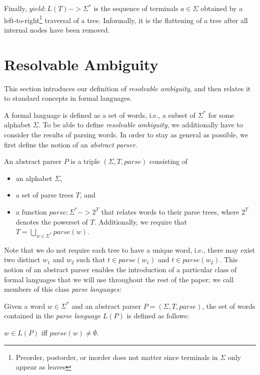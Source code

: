 \documentclass[acmsmall,review,anonymous]{acmart}\settopmatter{printfolios=true,printccs=false,printacmref=false}
\newcommand{\T}{\Sigma} %
\newcommand{\parse}{\mathit{parse}} %
\begin{document}
Finally, $yield : L(T) -> \T^{*}$ is the sequence of terminals $a \in \T$ obtained by a left-to-right\footnote{Preorder, postorder, or inorder does not matter since terminals in $\T$ only appear as leaves} traversal of a tree. Informally, it is the flattening of a tree after all internal nodes have been removed.

\section{Resolvable Ambiguity} \label{sec:resolvable-definition}

This section introduces our definition of \emph{resolvable ambiguity}, and then relates it to standard concepts in formal languages.

A formal language is defined as a set of words, i.e., a subset of $\T^{*}$ for some alphabet $\T$. To be able to define \emph{resolvable ambiguity}, we additionally have to consider the results of parsing words. In order to stay as general as possible, we first define the notion of an \emph{abstract parser}.

\begin{definition}
  An abstract parser $P$ is a triple $(\T, T, \parse)$ consisting of
\begin{itemize}
\item an alphabet $\T$,
\item a set of parse trees $T$, and
\item a function $\parse : \T^{*} -> 2^T$ that relates words to their parse trees, where $2^T$ denotes the powerset of $T$. Additionally, we require that $T = \bigcup_{w \in \T^{*}} \parse(w)$.
\end{itemize}
\end{definition}

\noindent Note that we do not require each tree to have a unique word, i.e., there may exist two distinct $w_1$ and $w_2$ such that $t \in \parse(w_1)$ and $t \in \parse(w_2)$. This notion of an abstract parser enables the introduction of a particular class of formal languages that we will use throughout the rest of the paper; we call members of this class \emph{parse languages:}

\begin{definition}
  Given a word $w \in \T^{*}$ and an abstract parser $P = (\T, T,
  \parse)$, the set of words contained in the \emph{parse language}
  $L(P)$ is defined as follows:

  $w \in L(P)$ iff $\parse(w) \neq \emptyset$.
\end{definition}
\end{document}
